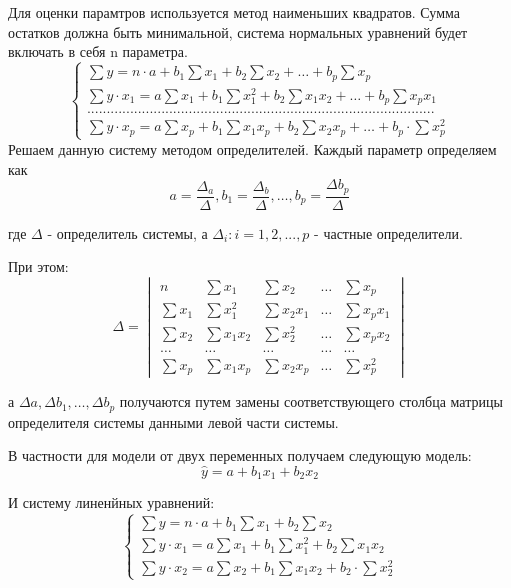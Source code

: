 \documentclass[aps,%
12pt,%
final,%
oneside,
onecolumn,%
musixtex, %
superscriptaddress,%
centertags]{article} %
\begin{document}
Для оценки парамтров используется метод наименьших квадратов. Сумма остатков должна быть минимальной, система нормальных уравнений будет включать в себя n параметра. 
$$\left \{
\begin{matrix}
	\sum y = n \cdot a + b_1 \sum x_1 + b_2 \sum x_2 + \ldots + b_p \sum x_p \\[0.3cm]
	\sum y \cdot x_1 = a \sum x_1 + b_1 \sum x_1^2 + b_2 \sum x_1x_2 + \ldots + b_p \sum x_p x_1 \\[0.3cm]
	......................................................................................... \\[0.3cm]
	\sum y \cdot x_p = a\sum x_p + b_1 \sum x_1x_p + b_2 \sum x_2x_p + \ldots + b_p \cdot \sum x_p^2
\end{matrix}
\right.
$$
Решаем данную систему методом определителей. Каждый параметр определяем как
$$ a =\frac{\Delta_a}{\Delta}, b_1 =\frac{\Delta_b}{\Delta}, \ldots , b_p = \frac{\Delta b_p}{\Delta} $$

где $\Delta$ - определитель системы, а $\Delta_i:  i ={1,2,...,p}$ - частные определители.

При этом:
$$\Delta = 
\begin{vmatrix}
n & \sum x_1 & \sum x_2 & \ldots & \sum x_p \\[0.3cm]
\sum x_1 & \sum x_1^2 & \sum x_2x_1 & \ldots & \sum x_px_1 \\[0.3cm]
\sum x_2 & \sum x_1x_2& \sum x_2^2 & \ldots & \sum x_p x_2 \\[0.3cm]
\ldots & \ldots & \ldots & \ldots & \ldots \\[0.3cm]
\sum x_p & \sum x_1x_p & \sum x_2x_p & \ldots & \sum x_p^2
\end{vmatrix}$$

а $\Delta a, \Delta b_1, \ldots , \Delta b_p$ получаются путем замены соответствующего столбца матрицы определителя системы данными левой части системы.

В частности для модели от двух переменных получаем следующую модель:
$$ \widehat{y} = a +b_1x_1 + b_2x_2$$

И систему линенйных уравнений:
$$\left \{
\begin{matrix}
	\sum y = n \cdot a + b_1 \sum x_1 + b_2 \sum x_2 \\[0.3cm]
	\sum y \cdot x_1 = a \sum x_1 + b_1 \sum x_1^2 + b_2 \sum x_1x_2\\[0.3cm]
	\sum y \cdot x_2 = a\sum x_2 + b_1 \sum x_1x_2 + b_2 \cdot \sum x_2^2
\end{matrix}
\right.
$$
\end{document}
